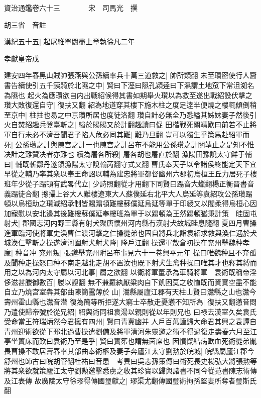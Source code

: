 資治通鑑卷六十三　　　　宋　司馬光　撰

胡三省　音註

漢紀五十五|{
	起屠維單閼盡上章執徐凡二年}


孝獻皇帝戊

建安四年春黑山賊帥張燕與公孫續率兵十萬三道救之|{
	帥所類翻}
未至瓚密使行人齎書告續使引五千銕騎於北隰之中|{
	賢曰下溼曰隰孔穎逹曰下濕謂土地窊下常沮洳名為隰也}
起火為應瓚欲自内出戰紹候得其書如期舉火瓚以為救至遂出戰紹設伏擊之瓚大敗復還自守|{
	復扶又翻}
紹為地道穿其樓下施木柱之度足逹半便燒之樓輒傾倒稍至京中|{
	柱拄也易之中京瓚所居也度徒洛翻}
瓚自計必無全乃悉縊其姊妹妻子然後引火自焚紹趣兵登臺斬之|{
	縊於賜賜又於計翻趣讀曰促}
田楷戰死關靖歎曰前若不止將軍自行未必不濟吾聞君子陷人危必同其難|{
	難乃旦翻}
豈可以獨生乎策馬赴紹軍而死|{
	公孫瓚之計與陳宫之計一也陳宫之計呂布不能用公孫瓚之計關靖止之是知不惟决計之難贊决者亦難也}
續為屠各所殺|{
	屠各胡也屠直於翻}
漁陽田豫說太守鮮于輔曰|{
	輔既斬鄒丹遂領漁陽太守說輸芮翻守式又翻}
曹氏奉天子以令諸侯終能定天下宜早從之輔乃率其衆以奉王命詔以輔為建忠將軍都督幽州六郡初烏桓王丘力居死子樓班年少從子蹋頓有武畧代立|{
	少詩照翻從才用翻下同賢曰蹋音大蠟翻楊正衡晋書音義蹋徒合翻}
摠攝上谷大人難樓遼東大人蘇僕延右北平大人烏延等袁紹攻公孫瓚蹋頓以烏桓助之瓚滅紹承制皆賜蹋頓難樓蘇僕延烏延等單于印綬又以閻柔得烏桓心因加寵慰以安北邊其後難樓蘇僕延奉樓班為單于以蹋頓為王然蹋頓猶秉計策　眭固屯射犬|{
	郡國志河内野王縣有射犬聚唐懷州河内縣冇漢射犬故城眭息隨翻}
夏四月曹操進軍臨河使將軍史渙曹仁渡河擊之仁操從弟也固自將兵北詣袁紹求救與渙仁遇於犬城渙仁擊斬之操遂濟河圍射犬射犬降|{
	降戶江翻}
操還軍敖倉初操在兖州舉魏种孝廉|{
	种音冲}
兖州叛|{
	張邈舉兖州附呂布事見六十一卷興平元年}
操曰唯魏种且不弃孤及聞种走操怒曰种不南走越北走胡不置汝也既下射犬生禽种操曰唯其才也釋其縛而用之以為河内太守屬以河北事|{
	屬之欲翻}
以衛將軍董承為車騎將軍　袁術既稱帝淫侈滋甚媵御數百|{
	媵以證翻}
無不兼羅紈厭粱肉自下飢困莫之收恤既而資實空盡不能自立乃燒宫室犇其部曲陳簡靁薄於山|{
	灊縣屬廬江郡有天柱山賢曰灊縣之山也灊今壽州霍山縣也灊音潜}
復為簡等所拒遂大窮士卒散走憂懣不知所為|{
	復扶又翻懣音悶}
乃遣使歸帝號於從兄紹|{
	紹與術同祖袁湯以親則從以年則兄也}
曰禄去漢室久矣袁氏受命當王符瑞炳然今君擁有四州|{
	賢曰青冀幽并}
人戶百萬謹歸大命君其興之袁譚自青州迎術欲從下邳北過曹操遣劉備及將軍清河朱靈邀之術不得過復走壽春六月至江亭坐簀床而歎曰袁術乃至是乎|{
	賢曰簀笫也謂無茵席也}
因憤慨結病歐血死術從弟胤畏曹操不敢居壽春率其部曲奉術柩及妻子奔廬江太守劉勲於皖城|{
	皖縣屬廬江郡今舒州也師古曰皖胡管翻杜祐曰音患　考異曰吳志孫策傳曰術死長史楊弘大將張勲等將其衆欲就策廬江太守劉勲邀擊悉虜之收其珍寶以歸與諸書不同今從范書陳志術傳及江表傳}
故廣陵太守徐璆得傳國璽獻之|{
	璆渠尤翻傳國璽術拘孫堅妻所奪者璽斯氏翻}
